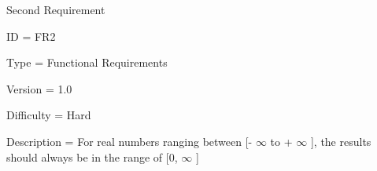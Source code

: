 \documentclass[12pt]{article}
\begin{document}
\begin{adjustwidth}{0.35in}{0.0in}
\begin{justify}
Second Requirement
\end{justify}\par

\end{adjustwidth}



\begin{adjustwidth}{0.49in}{0.0in}
\begin{justify}
ID = FR2
\end{justify}\par

\end{adjustwidth}



\begin{adjustwidth}{0.49in}{0.0in}
\begin{justify}
Type = Functional Requirements
\end{justify}\par

\end{adjustwidth}



\begin{adjustwidth}{0.49in}{0.0in}
\begin{justify}
Version = 1.0
\end{justify}\par

\end{adjustwidth}



\begin{adjustwidth}{0.49in}{0.0in}
\begin{justify}
Difficulty = Hard
\end{justify}\par

\end{adjustwidth}



\begin{adjustwidth}{0.49in}{0.0in}
\begin{justify}
Description = For real numbers ranging between [-\textcolor[HTML]{545454}{ $\infty$ } to +\textcolor[HTML]{545454}{ $\infty$ ]}, the results should always be in the range of [0, \textcolor[HTML]{545454}{$\infty$ }]
\end{justify}\par

\end{adjustwidth}
\end{document}
